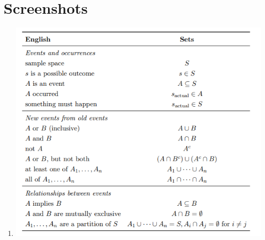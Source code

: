 \documentclass[12pt, letterpaper]{article}
\begin{document}
\section{Screenshots}
\begin{enumerate}
    \item \includegraphics{English.png}
\end{enumerate}
\end{document}
